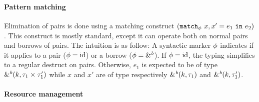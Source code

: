 





\paragraph{Pattern matching}
\label{sdtyping:matching}

Elimination of pairs is done using a matching construct
$(\mathtt{match}_{\phi}\ x,x' = e_1\ \mathtt{in}\ e_2)$.
This construct is mostly standard, except it can operate both
on normal pairs and borrows of pairs.
The intuition is as follow:
A syntactic marker $\phi$ indicates if it applies to
a pair ($\phi = \operatorname{id}$) or a borrow ($\phi = \&^{\textit{b}}$).
If $\phi = \operatorname{id}$, the typing simplifies to
a regular destruct on pairs.
Otherwise, $e_1$ is expected to be of type
${\&}^{\textit{b}}(k,\tau_1 \times^{{}} \tau'_1)$
while $x$ and $x'$ are of type respectively
${\&}^{\textit{b}}(k,\tau_1)$ and ${\&}^{\textit{b}}(k,\tau'_1)$.



\paragraph{Resource management}

